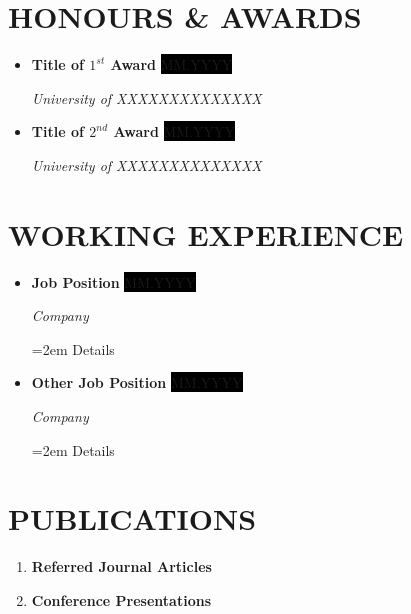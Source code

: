 \documentclass[paper=a4,fontsize=11pt]{scrartcl} %
\newcommand{\sepspace}{\vspace*{1em}}		%
\newcommand{\NewPart}[1]{\section*{\uppercase{#1}}}
\newcommand{\EducationEntry}[4]{
		\noindent \textbf{#1} \hfill      %
		\colorbox{Black}{%
			\parbox{6em}{%
			\hfill\color{White}#2}} \par  %
		\noindent \textit{#3} \par        %
		\noindent\hangindent=2em\hangafter=0 \small #4 %
		\normalsize \par}
\newcommand{\AwardEntry}[3]{
		\noindent \textbf{#1} \hfill      %
		\colorbox{Black}{\color{White}#2} \par  %
		\noindent \textit{#3} \par              %
		\normalsize \par}
\newcommand{\WorkEntry}[4]{				  %
		\noindent \textbf{#1} \hfill      %
		\colorbox{Black}{\color{White}#2} \par  %
		\noindent \textit{#3} \par              %
		\noindent\hangindent=2em\hangafter=0 \small #4 %
		\normalsize \par}
\begin{document}
\NewPart{Honours \& Awards}

\begin{itemize}[leftmargin=*]
    \item \AwardEntry{Title of $1^{st}$ Award}{\footnotesize MM.YYYY}{University of XXXXXXXXXXXXXX}
    \item \AwardEntry{Title of $2^{nd}$ Award}{\footnotesize MM.YYYY}{University of XXXXXXXXXXXXXX}
\end{itemize}
\sepspace





\NewPart{Working Experience}

\begin{itemize}[leftmargin=*]
    \item \WorkEntry{Job Position}{\footnotesize MM.YYYY}{Company}{Details}
    \item \WorkEntry{Other Job Position}{\footnotesize MM.YYYY}{Company}{Details}
\end{itemize}
\sepspace





\NewPart{Publications}
\begin{enumerate}[label=\textbf{\Alph*.},leftmargin=*]
    \item   \textbf{Referred Journal Articles}
            \begin{refsection}
            \nocite{*}
            \printbibliography[heading=none]
            \end{refsection}
    \item   \textbf{Conference Presentations}
            \begin{refsection}
            \nocite{*}
            \printbibliography[heading=none]
            \end{refsection}
\end{enumerate}
\end{document}
